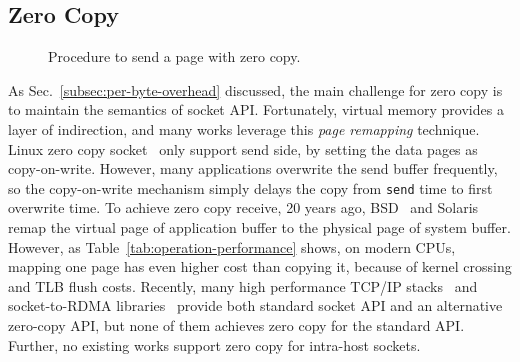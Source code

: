 \subsection{Zero Copy}
\label{subsec:zerocopy}

\begin{figure}[t]
	\centering
	\hspace{0.02\textwidth}
	\vspace{-10pt}
	\caption{Procedure to send a page with zero copy.}
\end{figure}


As Sec.~\ref{subsec:per-byte-overhead} discussed, the main challenge for zero copy is to maintain the semantics of socket API.
Fortunately, virtual memory provides a layer of indirection, and many works leverage this \emph{page remapping} technique.
Linux zero copy socket~\cite{linux-zero-copy} only support send side, by setting the data pages as copy-on-write.
However, many applications overwrite the send buffer frequently, so the copy-on-write mechanism simply delays the copy from \texttt{send} time to first overwrite time. 
To achieve zero copy receive, 20 years ago, BSD~\cite{thadani1995efficient} and Solaris~\cite{chu1996zero} remap the virtual page of application buffer to the physical page of system buffer. However, as Table~\ref{tab:operation-performance} shows, on modern CPUs, mapping one page has even higher cost than copying it, because of kernel crossing and TLB flush costs.
Recently, many high performance TCP/IP stacks~\cite{han2012megapipe,yasukata2016stackmap} and socket-to-RDMA libraries~\cite{rsockets,socketsdirect} provide both standard socket API and an alternative zero-copy API, but none of them achieves zero copy for the standard API.
Further, no existing works support zero copy for intra-host sockets.


